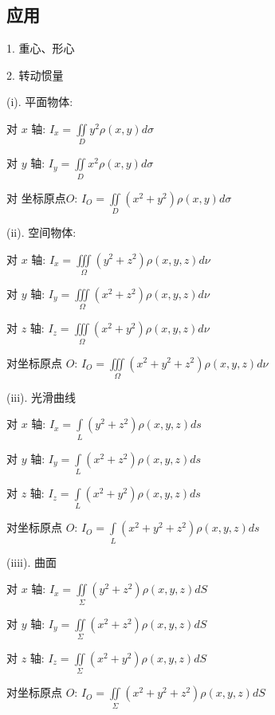 \subsection{应用}
1. 重心、形心

2. 转动惯量
\begin{definition}[转动惯量: $I=mr^2$]
	
	(i). 平面物体: 
	
	对 $x$ 轴: $I_{x}=\iint\limits_{D}y^2\rho(x,y)d\sigma$
	
	对 $y$ 轴: $I_{y}=\iint\limits_{D}x^2\rho(x,y)d\sigma$
	
	对 坐标原点$O$: $I_{O}=\iint\limits_{D}(x^2+y^2)\rho(x,y)d\sigma$
	
	(ii). 空间物体: 
	
	对 $x$ 轴: $I_{x}=\iiint\limits_{\Omega}(y^2+z^2)\rho(x,y,z)d\nu$
	
	对 $y$ 轴: $I_{y}=\iiint\limits_{\Omega}(x^2+z^2)\rho(x,y,z)d\nu$
	
	对 $z$ 轴: $I_{z}=\iiint\limits_{\Omega}(x^2+y^2)\rho(x,y,z)d\nu$
	
	对坐标原点 $O$: $I_{O}=\iiint\limits_{\Omega}(x^2+y^2+z^2)\rho(x,y,z)d\nu$
	
	(iii). 光滑曲线
	
	对 $x$ 轴: $I_{x}=\int\limits_{L}(y^2+z^2)\rho(x,y,z)ds$
	
	对 $y$ 轴: $I_{y}=\int\limits_{L}(x^2+z^2)\rho(x,y,z)ds$
	
	对 $z$ 轴: $I_{z}=\int\limits_{L}(x^2+y^2)\rho(x,y,z)ds$
	
	对坐标原点 $O$: $I_{O}=\int\limits_{L}(x^2+y^2+z^2)\rho(x,y,z)ds$
	
	(iiii). 曲面
	
	对 $x$ 轴: $I_{x}=\iint\limits_{\Sigma}(y^2+z^2)\rho(x,y,z)dS$
	
	对 $y$ 轴: $I_{y}=\iint\limits_{\Sigma}(x^2+z^2)\rho(x,y,z)dS$
	
	对 $z$ 轴: $I_{z}=\iint\limits_{\Sigma}(x^2+y^2)\rho(x,y,z)dS$
	
	对坐标原点 $O$: $I_{O}=\iint\limits_{\Sigma}(x^2+y^2+z^2)\rho(x,y,z)dS$
	
\end{definition}

